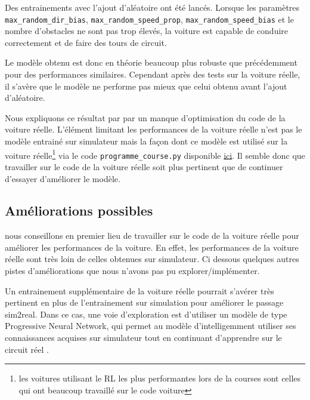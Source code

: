\documentclass[french]{article}
\begin{document}
Des entrainements avec l'ajout d'aléatoire ont été lancés. Lorsque les paramètres \verb|max_random_dir_bias|, \verb|max_random_speed_prop|, \verb|max_random_speed_bias| et le nombre d'obstacles ne sont pas trop élevés, la voiture est capable de conduire correctement et de faire des tours de circuit.

\vspace{0.5cm}

Le modèle obtenu est donc en théorie beaucoup plus robuste que précédemment pour des performances similaires. Cependant après des tests sur la voiture réelle, il s'avère que le modèle ne performe pas mieux que celui obtenu avant l'ajout d'aléatoire. 
\vspace{0.5cm}

Nous expliquons ce résultat par par un manque d'optimisation du code de la voiture réelle. L'élément limitant les performances de la voiture réelle n'est pas le modèle entrainé sur simulateur mais la façon dont ce modèle est utilisé sur la voiture réelle\footnote{les voitures utilisant le RL les plus performantes lors de la courses sont celles qui ont beaucoup travaillé sur le code voiture} via le code \verb|programme_course.py| disponible \href{https://github.com/basileplus/RCAutonomousCar.git}{ici}. Il semble donc que travailler sur le code de la voiture réelle soit plus pertinent que de continuer d'essayer d'améliorer le modèle.

\subsection{Améliorations possibles}

nous conseillons en premier lieu de travailler sur le code de la voiture réelle pour améliorer les performances de la voiture. En effet, les performances de la voiture réelle sont très loin de celles obtenues sur simulateur. Ci dessous quelques autres pistes d'améliorations que nous n'avons pas pu explorer/implémenter.

\vspace{1cm}

Un entrainement supplémentaire de la voiture réelle pourrait s'avérer très pertinent en plus de l'entrainement sur simulation pour améliorer le passage sim2real. Dans ce cas, une voie d'exploration est d'utiliser un modèle de type Progressive Neural Network, qui permet au modèle d'intelligemment utiliser ses connaissances acquises sur simulateur tout en continuant d'apprendre sur le circuit réel \cite{rusu2022progressive}. 
\end{document}
